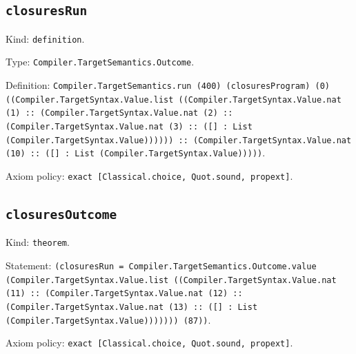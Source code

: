 \documentclass[11pt]{article}
\begin{document}
\subsection*{\texttt{closuresRun}}
\noindent Kind: \texttt{definition}.\par
\noindent Type: \texttt{Compiler.TargetSemantics.Outcome}.\par
\noindent Definition: \texttt{Compiler.TargetSemantics.run (400) (closuresProgram) (0) ((Compiler.TargetSyntax.Value.list ((Compiler.TargetSyntax.Value.nat (1) :: (Compiler.TargetSyntax.Value.nat (2) :: (Compiler.TargetSyntax.Value.nat (3) :: ([] : List (Compiler.TargetSyntax.Value)))))) :: (Compiler.TargetSyntax.Value.nat (10) :: ([] : List (Compiler.TargetSyntax.Value)))))}.\par
\noindent Axiom policy: \texttt{exact [Classical.choice, Quot.sound, propext]}.\par
\subsection*{\texttt{closuresOutcome}}
\noindent Kind: \texttt{theorem}.\par
\noindent Statement: \texttt{(closuresRun = Compiler.TargetSemantics.Outcome.value (Compiler.TargetSyntax.Value.list ((Compiler.TargetSyntax.Value.nat (11) :: (Compiler.TargetSyntax.Value.nat (12) :: (Compiler.TargetSyntax.Value.nat (13) :: ([] : List (Compiler.TargetSyntax.Value))))))) (87))}.\par
\noindent Axiom policy: \texttt{exact [Classical.choice, Quot.sound, propext]}.\par
\end{document}
